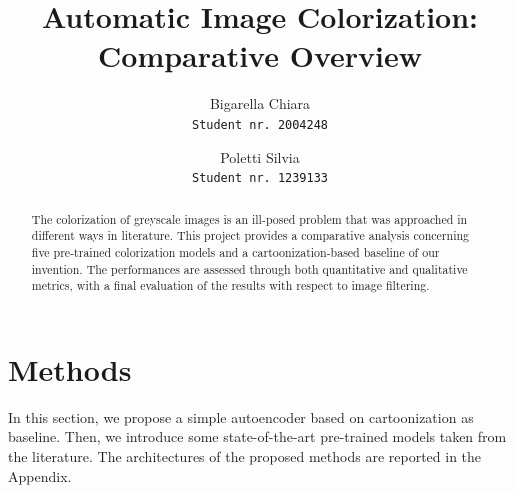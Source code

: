 \documentclass[10pt,twocolumn,letterpaper]{article}
\begin{document}
\title{\vspace{-2cm}Automatic Image Colorization: Comparative Overview}
\author{Bigarella Chiara\\
{\tt\small Student nr. 2004248}
\and
Poletti Silvia\\
{\tt\small Student nr. 1239133}
}

\maketitle

\begin{abstract}
   The colorization of greyscale images is an ill-posed problem that was approached in different ways in literature. This project provides a comparative analysis concerning five pre-trained colorization models and a cartoonization-based baseline of our invention. The performances are assessed through both quantitative and qualitative metrics, with a final evaluation of the results with respect to image filtering. 
\end{abstract}





\section{Methods}
In this section, we propose a simple autoencoder based on cartoonization as baseline. Then, we introduce some state-of-the-art pre-trained models taken from the literature. The architectures of the proposed methods are reported in the Appendix.






\end{document}

